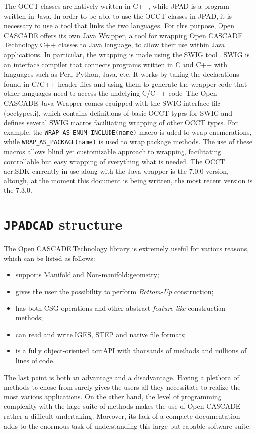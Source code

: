 The \gls{OCCT} classes are natively written in C++, while \gls{JPAD} is a program written in Java. In order to be able to use the \gls{OCCT} classes in \gls{JPAD}, it is necessary to use a tool that links the two languages. For this purpose, Open CASCADE offers its own Java Wrapper, a tool for wrapping Open CASCADE Technology C++ classes to Java language, to allow their use within Java applications. In particular, the wrapping is made using the \gls{SWIG} tool \cite{webSWIG}. \gls{SWIG} is an interface compiler that connects programs written in C and C++ with languages such as Perl, Python, Java, etc. It works by taking the declarations found in C/C++ header files and using them to generate the wrapper code that other languages need to access the undelying C/C++ code. The Open CASCADE Java Wrapper comes equipped with the \gls{SWIG} interface file (occtypes.i), which contains definitions of basic \gls{OCCT} types for \gls{SWIG} and defines several \gls{SWIG} macros facilitating wrapping of other \gls{OCCT} types. For example, the \texttt{WRAP_AS_ENUM_INCLUDE(name)} macro is uded to wrap enumerations, while \texttt{WRAP_AS_PACKAGE(name)} is used to wrap package methods. The use of these macros allows blind yet customizable approach to wrapping, facilitating controllable but easy wrapping of everything what is needed. The \gls{OCCT} \gls{acr:SDK} currently in use along with the Java wrapper is the 7.0.0 version, altough, at the moment this document is being written, the most recent version is the 7.3.0.

\section{\texttt{JPADCAD} structure}
\label{sec2.3}

The Open CASCADE Technology library is extremely useful for various reasons, which can be listed as follows:
%
\begin{itemize}
\item supports Manifold and Non-\gls{manifold:geometry};
\item gives the user the possibility to perform \emph{Bottom-Up} construction;
\item has both \gls{CSG} operations and other abstract \emph{feature-like} construction methods;
\item can read and write IGES, STEP and native file formats;
\item is a fully object-oriented \gls{acr:API} with thousands of methods and millions of lines of code.
\end{itemize}
%
The last point is both an advantage and a disadvantage. Having a plethora of methods to chose from surely gives the users all they necessitate to realize the most various applications. On the other hand, the level of programming complexity with the huge suite of methods makes the use of Open CASCADE rather a difficult undertaking. Moreover, its lack of a complete documentation adds to the enormous task of understanding this large but capable software suite. 

